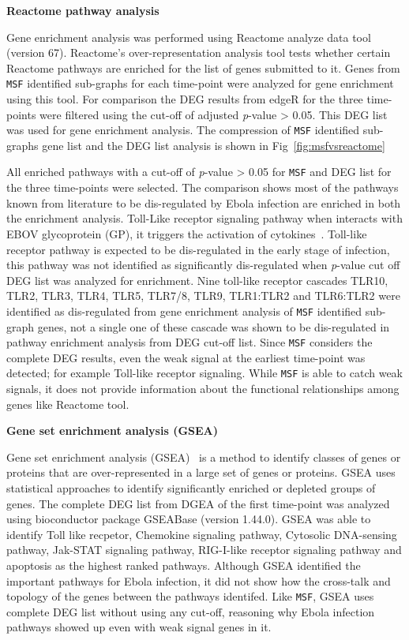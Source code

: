 \documentclass[10pt,a4paper,twocolumn]{article}
\begin{document}
\textbf{Reactome pathway analysis}

Gene enrichment analysis was performed using Reactome analyze data
tool~\cite{Reactome} (version 67). Reactome's over-representation analysis tool tests whether
certain Reactome pathways are enriched for the list of genes submitted to it. Genes from \texttt{MSF} identified
sub-graphs for each time-point were analyzed for gene enrichment using this tool.  For
comparison the DEG results from edgeR for the three time-points were filtered using the cut-off of
adjusted \textit{p}-value > 0.05. This DEG list was used for gene
enrichment analysis. The compression of \texttt{MSF} identified sub-graphs gene list and the DEG list analysis is shown in Fig~\ref{fig:msfvsreactome}

All enriched pathways with a cut-off of \textit{p}-value > 0.05 for \texttt{MSF} and DEG list for the three time-points were selected. The comparison shows most of the pathways known from literature
to be dis-regulated by Ebola infection are enriched in both the enrichment
analysis. Toll-Like receptor signaling pathway when interacts with EBOV
glycoprotein (GP), it triggers the activation of
cytokines~\cite{Olejnik}. Toll-like receptor pathway is expected to be dis-regulated in the early stage of infection, this pathway was not identified as significantly dis-regulated when \textit{p}-value
cut off DEG list was analyzed for enrichment. Nine toll-like receptor cascades TLR10, TLR2, TLR3, TLR4, TLR5, TLR7/8, TLR9, TLR1:TLR2 and TLR6:TLR2 were identified as dis-regulated from gene enrichment analysis of \texttt{MSF} identified sub-graph genes, not a single one of these cascade was shown to be dis-regulated in pathway enrichment analysis from DEG cut-off list. Since \texttt{MSF}
considers the complete DEG results, even the weak signal at the earliest
time-point was detected; for example Toll-like receptor signaling. While \texttt{MSF} is able to catch weak signals, it does not provide information about the functional relationships among genes like Reactome tool. 

\textbf{Gene set enrichment analysis (GSEA)}

Gene set enrichment analysis (GSEA)~\cite{Subramanian15545} is a method to identify classes of genes or proteins that are over-represented in a large set of genes or proteins. GSEA uses statistical approaches to identify significantly enriched or depleted groups of genes. The complete DEG list from DGEA of the first time-point was analyzed using bioconductor package GSEABase (version 1.44.0). GSEA was able to identify Toll like recpetor, Chemokine signaling pathway, Cytosolic DNA-sensing pathway, Jak-STAT signaling pathway, RIG-I-like receptor signaling pathway and apoptosis as the highest ranked pathways. Although GSEA identified the important pathways for Ebola infection, it did not show how the cross-talk and topology of the genes between the pathways identifed. Like \texttt{MSF}, GSEA uses complete DEG list without using any cut-off, reasoning why Ebola infection pathways showed up even with weak signal genes in it.
\end{document}
